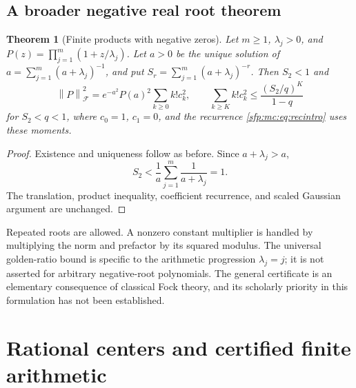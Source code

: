\documentclass[11pt,letterpaper]{article}
\numberwithin{equation}{section}
\newtheorem{theorem}{Theorem}[section]
\theoremstyle{definition}\newtheorem{definition}[theorem]{Definition}
\theoremstyle{remark}\newtheorem{remark}[theorem]{Remark}
\newcommand{\Fock}[1]{\left\lVert #1\right\rVert_{\mathcal F}^{2}}
\begin{document}
\subsection{A broader negative real root theorem}
\begin{theorem}[Finite products with negative zeros]\label{sfp:mc:thm:generic}
Let $m\geq1$, $\lambda_j>0$, and
$P(z)=\prod_{j=1}^{m}(1+z/\lambda_j)$.
Let $a>0$ be the unique solution of
$a=\sum_{j=1}^{m}(a+\lambda_j)^{-1}$, and put
$S_r=\sum_{j=1}^{m}(a+\lambda_j)^{-r}$.
Then $S_2<1$ and
\[
 \Fock{P}=e^{-a^2}P(a)^2\sum_{k\geq0}k!c_k^2,
 \qquad
 \sum_{k\geq K}k!c_k^2\leq\frac{(S_2/q)^K}{1-q}
\]
for $S_2<q<1$, where $c_0=1$, $c_1=0$, and the recurrence
\eqref{sfp:mc:eq:recintro} uses these moments.
\end{theorem}
\begin{proof}
Existence and uniqueness follow as before. Since $a+\lambda_j>a$,
\[
 S_2<\frac1a\sum_{j=1}^{m}\frac1{a+\lambda_j}=1.
\]
The translation, product inequality, coefficient recurrence, and
scaled Gaussian argument are unchanged.
\end{proof}

Repeated roots are allowed. A nonzero constant multiplier is
handled by multiplying the norm and prefactor by its squared
modulus. The universal golden-ratio bound is specific to the
arithmetic progression $\lambda_j=j$; it is not asserted for
arbitrary negative-root polynomials. The general certificate is an
elementary consequence of classical Fock theory, and its scholarly
priority in this formulation has not been established.

\section{Rational centers and certified finite arithmetic}
\label{sfp:mc:sec:rational}
\end{document}
